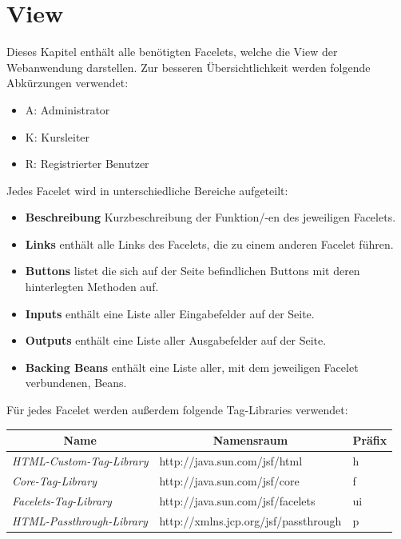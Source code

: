 \chapter{View}
	
		Dieses Kapitel enthält alle benötigten Facelets, welche die View der Webanwendung darstellen. Zur besseren Übersichtlichkeit werden folgende Abkürzungen verwendet:
		\begin{itemize}
			\item A: Administrator
			\item K: Kursleiter
			\item R: Registrierter Benutzer
		\end{itemize}		
		Jedes Facelet wird in unterschiedliche Bereiche aufgeteilt:
		\begin{itemize}
			\item \textbf{Beschreibung} Kurzbeschreibung der Funktion/-en des jeweiligen Facelets.
			\item \textbf{Links} enthält alle Links des Facelets, die zu einem anderen Facelet führen.
			\item \textbf{Buttons} listet die sich auf der Seite befindlichen Buttons mit deren hinterlegten Methoden auf.
			\item \textbf{Inputs} enthält eine Liste aller Eingabefelder auf der Seite.
			\item \textbf{Outputs} enthält eine Liste aller Ausgabefelder auf der Seite.
			\item \textbf{Backing Beans} enthält eine Liste aller, mit dem jeweiligen Facelet verbundenen, Beans.
		\end{itemize}
		Für jedes Facelet werden außerdem folgende Tag-Libraries verwendet:
			\begin{center}
				\begin{longtable}{|p{6cm} | p{8cm}| p{2cm}|}
					
					\hline \multicolumn{1}{|c|}{\textbf{Name}} & \multicolumn{1}{c|}{\textbf{Namensraum}} & \multicolumn{1}{c|}{\textbf{Präfix}} \\ \hline
					\endfirsthead
					\hline
					\endlastfoot
					\textit{HTML-Custom-Tag-Library} & http://java.sun.com/jsf/html & h\\ \hline
					\textit{Core-Tag-Library} & http://java.sun.com/jsf/core & f\\ \hline
					\textit{Facelets-Tag-Library} & http://java.sun.com/jsf/facelets & ui\\ \hline
					\textit{HTML-Passthrough-Library} & http://xmlns.jcp.org/jsf/passthrough & p\\ \hline
				\end{longtable}
			\end{center}
		
